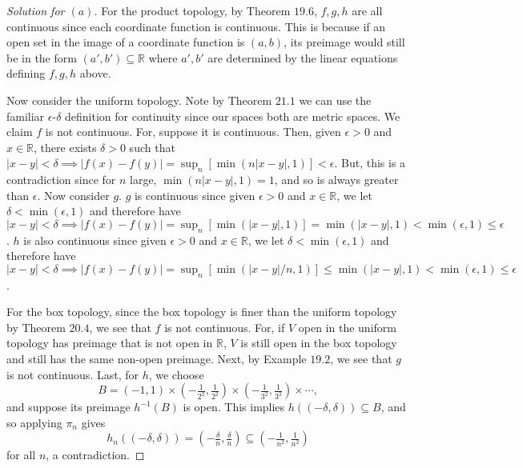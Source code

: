 \documentclass[12pt]{article}
\theoremstyle{remark}
\begin{document}
\begin{proof}[Solution for $(a)$]
  For the product topology, by Theorem $19.6$, $f,g,h$ are all continuous since each coordinate function is continuous. This is because if an open set in the image of a coordinate function is $(a,b)$, its preimage would still be in the form $(a',b') \subseteq \mathbb{R}$ where $a',b'$ are determined by the linear equations defining $f,g,h$ above.
  \par Now consider the uniform topology. Note by Theorem $21.1$ we can use the familiar $\epsilon$-$\delta$ definition for continuity since our spaces both are metric spaces. We claim $f$ is not continuous. For, suppose it is continuous. Then, given $\epsilon > 0$ and $x \in \mathbb{R}$, there exists $\delta > 0$ such that $|x-y| < \delta \implies |f(x) - f(y)| = \sup_n[\min(n|x-y|,1)] < \epsilon$. But, this is a contradiction since for $n$ large, $\min(n|x-y|,1) = 1$, and so is always greater than $\epsilon$. Now consider $g$. $g$ is continuous since given $\epsilon > 0$ and $x \in \mathbb{R}$, we let $\delta < \min(\epsilon,1)$ and therefore have $|x-y| < \delta \implies |f(x) - f(y)| = \sup_n[\min(|x-y|,1)] = \min(|x-y|,1) < \min(\epsilon,1) \le \epsilon$. $h$ is also continuous since given $\epsilon > 0$ and $x \in \mathbb{R}$, we let $\delta < \min(\epsilon,1)$ and therefore have $|x-y| < \delta \implies |f(x) - f(y)| = \sup_n[\min(|x-y|/n,1)] \le \min(|x-y|,1) < \min(\epsilon,1) \le \epsilon$.
  \par For the box topology, since the box topology is finer than the uniform topology by Theorem $20.4$, we see that $f$ is not continuous. For, if $V$ open in the uniform topology has preimage that is not open in $\mathbb{R}$, $V$ is still open in the box topology and still has the same non-open preimage. Next, by Example $19.2$, we see that $g$ is not continuous. Last, for $h$, we choose
  \begin{equation*}
    B = (-1,1) \times ( -\tfrac{1}{2^2}, \tfrac{1}{2^2} ) \times
    ( -\tfrac{1}{3^2}, \tfrac{1}{3^2} ) \times \cdots,
  \end{equation*}
  and suppose its preimage $h^{-1}(B)$ is open. This implies $h((-\delta,\delta)) \subseteq B$, and so applying $\pi_n$ gives
  \begin{equation*}
    h_n((-\delta,\delta)) = ( -\tfrac{\delta}{n},\tfrac{\delta}{n} ) \subseteq ( -\tfrac{1}{n^2},\tfrac{1}{n^2} )
  \end{equation*}
  for all $n$, a contradiction.
\end{proof}
\end{document}
